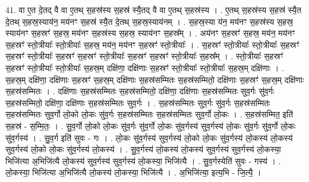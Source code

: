 \documentclass[17pt]{extarticle}
\begin{document}
41. वा ए॒त दे॒तद् वै वा ए॒तथ् स॒हस्र॑स्य स॒हस्र॑ स्यै॒तद् वै वा ए॒तथ् स॒हस्र॑स्य । . ए॒तथ् स॒हस्र॑स्य स॒हस्र॑ स्यै॒त दे॒तथ् स॒हस्र॒स्याय॑न॒ मय॑नꣳ स॒हस्र॑ स्यै॒त दे॒तथ् स॒हस्र॒स्याय॑नम् । . स॒हस्र॒स्या य॑न॒ मय॑नꣳ स॒हस्र॑स्य स॒हस्र॒ स्याय॑नꣳ स॒हस्रꣳ॑ स॒हस्र॒ मय॑नꣳ स॒हस्र॑स्य स॒हस्र॒ स्याय॑नꣳ स॒हस्र᳚म् । . अय॑नꣳ स॒हस्रꣳ॑ स॒हस्र॒ मय॑न॒ मय॑नꣳ स॒हस्रꣳ॑ स्तो॒त्रीयाः᳚ स्तो॒त्रीयाः᳚ स॒हस्र॒ मय॑न॒ मय॑नꣳ स॒हस्रꣳ॑ स्तो॒त्रीयाः᳚ । . स॒हस्रꣳ॑ स्तो॒त्रीयाः᳚ स्तो॒त्रीयाः᳚ स॒हस्रꣳ॑ स॒हस्रꣳ॑ स्तो॒त्रीयाः᳚ स॒हस्रꣳ॑ स॒हस्रꣳ॑ स्तो॒त्रीयाः᳚ स॒हस्रꣳ॑ स॒हस्रꣳ॑ स्तो॒त्रीयाः᳚ स॒हस्र᳚म् । . स्तो॒त्रीयाः᳚ स॒हस्रꣳ॑ स॒हस्रꣳ॑ स्तो॒त्रीयाः᳚ स्तो॒त्रीयाः᳚ स॒हस्र॒म् दक्षि॑णा॒ दक्षि॑णाः स॒हस्रꣳ॑ स्तो॒त्रीयाः᳚ स्तो॒त्रीयाः᳚ स॒हस्र॒म् दक्षि॑णाः । . स॒हस्र॒म् दक्षि॑णा॒ दक्षि॑णाः स॒हस्रꣳ॑ स॒हस्र॒म् दक्षि॑णाः स॒हस्र॑सम्मितः स॒हस्र॑सम्मितो॒ दक्षि॑णाः स॒हस्रꣳ॑ स॒हस्र॒म् दक्षि॑णाः स॒हस्र॑सम्मितः । . दक्षि॑णाः स॒हस्र॑सम्मितः स॒हस्र॑सम्मितो॒ दक्षि॑णा॒ दक्षि॑णाः स॒हस्र॑सम्मितः सुव॒र्गः सु॑व॒र्गः स॒हस्र॑सम्मितो॒ दक्षि॑णा॒ दक्षि॑णाः स॒हस्र॑सम्मितः सुव॒र्गः । . स॒हस्र॑सम्मितः सुव॒र्गः सु॑व॒र्गः स॒हस्र॑सम्मितः स॒हस्र॑सम्मितः सुव॒र्गो लो॒को लो॒कः सु॑व॒र्गः स॒हस्र॑सम्मितः स॒हस्र॑सम्मितः सुव॒र्गो लो॒कः । . स॒हस्र॑सम्मित॒ इति॑ स॒हस्र॑ - स॒म्मि॒तः॒ । . सु॒व॒र्गो लो॒को लो॒कः सु॑व॒र्गः सु॑व॒र्गो लो॒कः सु॑व॒र्गस्य॑ सुव॒र्गस्य॑ लो॒कः सु॑व॒र्गः सु॑व॒र्गो लो॒कः सु॑व॒र्गस्य॑ । . सु॒व॒र्ग इति॑ सुवः - गः । . लो॒कः सु॑व॒र्गस्य॑ सुव॒र्गस्य॑ लो॒को लो॒कः सु॑व॒र्गस्य॑ लो॒कस्य॑ लो॒कस्य॑ सुव॒र्गस्य॑ लो॒को लो॒कः सु॑व॒र्गस्य॑ लो॒कस्य॑ । . सु॒व॒र्गस्य॑ लो॒कस्य॑ लो॒कस्य॑ सुव॒र्गस्य॑ सुव॒र्गस्य॑ लो॒कस्या॒ भिजि॑त्या अ॒भिजि॑त्यै लो॒कस्य॑ सुव॒र्गस्य॑ सुव॒र्गस्य॑ लो॒कस्या॒ भिजि॑त्यै । . सु॒व॒र्गस्येति॑ सुवः - गस्य॑ । . लो॒कस्या॒ भिजि॑त्या अ॒भिजि॑त्यै लो॒कस्य॑ लो॒कस्या॒ भिजि॑त्यै । . अ॒भिजि॑त्या॒ इत्य॒भि - जि॒त्यै॒ । \newline
\pagebreak
{}
\end{document}
